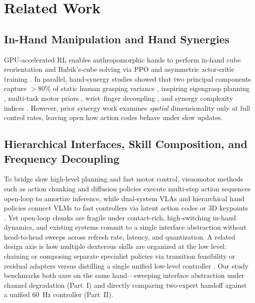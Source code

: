 \section{Related Work}
\label{sec:related}

\subsection{In-Hand Manipulation and Hand Synergies}
GPU-accelerated RL enables anthropomorphic hands to perform in-hand cube reorientation \citep{andrychowicz2020learning,mittal2023orbit} and Rubik's-cube solving \citep{akkaya2019solving} via PPO \citep{schulman2017proximal,makoviichuk2021rlgames} and asymmetric actor-critic training \citep{pinto2018asymmetric}.
In parallel, hand-synergy studies showed that two principal components capture $>80\%$ of static human grasping variance \citep{santello1998postural}, inspiring eigengrasp planning \citep{ciocarlie2009hand}, multi-task motor priors \citep{caggiano2023myodex,yuan2025crossdex}, wrist--finger decoupling \citep{liu2016analysis,jarquebou2019kinematic}, and synergy complexity indices \citep{west2025synergy}.
However, prior synergy work examines \emph{spatial} dimensionality only at full control rates, leaving open how action codes behave under slow updates.

\subsection{Hierarchical Interfaces, Skill Composition, and Frequency Decoupling}
To bridge slow high-level planning and fast motor control, visuomotor methods such as action chunking \citep{zhao2023learning} and diffusion policies \citep{chi2023diffusion} execute multi-step action sequences open-loop to amortize inference, while dual-system VLAs and hierarchical hand policies connect VLMs to fast controllers via latent action codes or 3D keypoints \citep{chen2025fastinslow,jiang2026xlvla,debakker2025scaffolding}.
Yet open-loop chunks are fragile under contact-rich, high-switching in-hand dynamics, and existing systems commit to a single interface abstraction without head-to-head sweeps across refresh rate, latency, and quantization.
A related design axis is how multiple dexterous skills are organized at the low level: chaining or composing separate specialist policies via transition feasibility or residual adapters \citep{chen2023sequential,huang2026dexcompose} versus distilling a single unified low-level controller \citep{yin2025dexteritygen}.
Our study benchmarks both axes on the same hand---sweeping interface abstraction under channel degradation (Part~I) and directly comparing two-expert handoff against a unified 60~Hz controller (Part~II).

